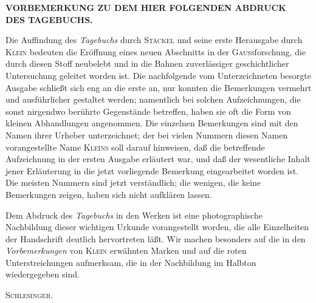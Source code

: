 \bigskip
\begin{center}\bfseries
VORBEMERKUNG ZU DEM HIER FOLGENDEN ABDRUCK\\
DES TAGEBUCHS.
\end{center}
\indent Die Auffindung des \textit{Tagebuchs} durch \textsc{Stäckel} und seine erste Herausgabe durch \textsc{Klein} bedeuten die Eröffnung eines neuen Abschnitts in der \textsc{Gauss}forschung, die durch diesen Stoff neubelebt und in die Bahnen zuverlässiger geschichtlicher Untersuchung geleitet worden ist. Die nachfolgende vom Unterzeichneten besorgte Ausgabe schließt sich eng an die erste an, nur konnten die Bemerkungen vermehrt und ausführlicher gestaltet werden; namentlich bei solchen Aufzeichnungen, die sonst nirgendwo berührte Gegenstände betreffen, haben sie oft die Form von kleinen Abhandlungen angenommen. Die einzelnen Bemerkungen sind mit den Namen ihrer Urheber unterzeichnet; der bei vielen Nummern diesen Namen vorangestellte Name \textsc{Kleins} soll darauf hinweisen, daß die betreffende Aufzeichnung in der ersten Ausgabe erläutert war, und daß der wesentliche Inhalt jener Erläuterung in die jetzt vorliegende Bemerkung eingearbeitet worden ist. Die meisten Nummern sind jetzt verständlich; die wenigen, die keine Bemerkungen zeigen, haben sich nicht aufklären lassen.

\indent Dem Abdruck des \textit{Tagebuchs} in den Werken ist eine photographische Nachbildung dieser wichtigen Urkunde vorangestellt worden, die alle Einzelheiten der Handschrift deutlich hervortreten läßt. Wir machen besonders auf die in den \textit{Vorbemerkungen} von \textsc{Klein} erwähnten Marken und auf die roten Unterstreichungen aufmerksam, die in der Nachbildung im Halbton wiedergegeben sind.
\par\noindent\hfill\textsc{Schlesinger}.
\ClosingRule
